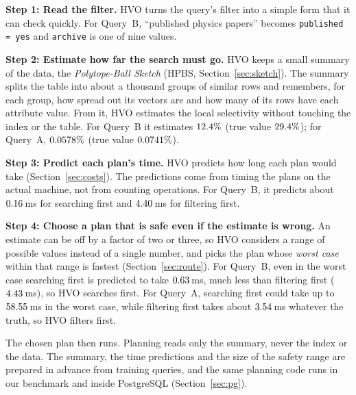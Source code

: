 \documentclass[sigconf,nonacm]{acmart}
\begin{document}
\noindent\textbf{Step 1: Read the filter.} HVO turns the query's filter into a simple form that it can check quickly. For Query~B, ``published physics papers'' becomes \texttt{published = yes} and \texttt{archive} is one of nine values.

\noindent\textbf{Step 2: Estimate how far the search must go.} HVO keeps a small summary of the data, the \emph{Polytope-Ball Sketch} (HPBS, Section~\ref{sec:sketch}). The summary splits the table into about a thousand groups of similar rows and remembers, for each group, how spread out its vectors are and how many of its rows have each attribute value. From it, HVO estimates the local selectivity without touching the index or the table. For Query~B it estimates $12.4\%$ (true value $29.4\%$); for Query~A, $0.0578\%$ (true value $0.0741\%$).

\noindent\textbf{Step 3: Predict each plan's time.} HVO predicts how long each plan would take (Section~\ref{sec:costs}). The predictions come from timing the plans on the actual machine, not from counting operations. For Query~B, it predicts about $0.16$\,ms for searching first and $4.40$\,ms for filtering first.

\noindent\textbf{Step 4: Choose a plan that is safe even if the estimate is wrong.} An estimate can be off by a factor of two or three, so HVO considers a range of possible values instead of a single number, and picks the plan whose \emph{worst case} within that range is fastest (Section~\ref{sec:route}). For Query~B, even in the worst case searching first is predicted to take $0.63$\,ms, much less than filtering first ($4.43$\,ms), so HVO searches first. For Query~A, searching first could take up to $58.55$\,ms in the worst case, while filtering first takes about $3.54$\,ms whatever the truth, so HVO filters first.

The chosen plan then runs. Planning reads only the summary, never the index or the data. The summary, the time predictions and the size of the safety range are prepared in advance from training queries, and the same planning code runs in our benchmark and inside PostgreSQL (Section~\ref{sec:pg}).
\end{document}
